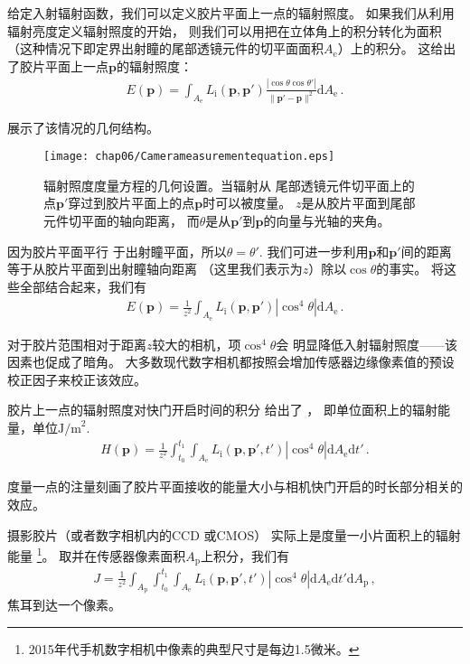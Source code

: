 给定入射辐射函数，我们可以定义胶片平面上一点的辐射照度。
如果我们从利用辐射亮度定义辐射照度的开始，
则我们可以用把在立体角上的积分转化为面积
（这种情况下即定界出射瞳的尾部透镜元件的切平面面积$A_{\mathrm{e}}$）上的积分。
这给出了胶片平面上一点$\bm p$的辐射照度：
\begin{align*}
    E({\bm p})=\int_{A_{\mathrm{e}}}{L_{\mathrm{i}}({\bm p},{\bm p}')
    \frac{|\cos\theta\cos\theta'|}{\|{\bm p}'-{\bm p}\|^2}\mathrm{d}A_{\mathrm{e}}}\, .
\end{align*}

展示了该情况的几何结构。
\begin{figure}[htbp]
    \centering\texttt{[image: chap06/Camerameasurementequation.eps]}
    \caption{辐射照度度量方程的几何设置。当辐射从
        尾部透镜元件切平面上的点$\bm p'$穿过到胶片平面上的点$\bm p$时可以被度量。
        $z$是从胶片平面到尾部元件切平面的轴向距离，
        而$\theta$是从$\bm p'$到$\bm p$的向量与光轴的夹角。}
    \label{fig:6.25}
\end{figure}

因为胶片平面平行
于出射瞳平面，所以$\theta=\theta'$.
我们可进一步利用$\bm p$和$\bm p'$间的距离等于从胶片平面到出射瞳轴向距离
（这里我们表示为$z$）除以$\cos\theta$的事实。
将这些全部结合起来，我们有
\begin{align}\label{eq:6.5}
    E({\bm p})=\frac{1}{z^2}\int_{A_{\mathrm{e}}}{L_{\mathrm{i}}({\bm p},{\bm p}')|\cos^4\theta|\mathrm{d}A_{\mathrm{e}}}\, .
\end{align}

对于胶片范围相对于距离$z$较大的相机，项$\cos^4\theta$会
明显降低入射辐射照度——该因素也促成了暗角。
大多数现代数字相机都按照会增加传感器边缘像素值的预设校正因子来校正该效应。

胶片上一点的辐射照度对快门开启时间的积分
给出了
，
即单位面积上的辐射能量，单位$\text{J/m}^2$.
\begin{align}\label{eq:6.6}
    H({\bm p})=\frac{1}{z^2}\int_{t_0}^{t_1}\int_{A_{\mathrm{e}}}
    L_{\mathrm{i}}({\bm p},{\bm p}',t')|\cos^4\theta|\mathrm{d}A_{\mathrm{e}}\mathrm{d}t'\, .
\end{align}

度量一点的注量刻画了胶片平面接收的能量大小与相机快门开启的时长部分相关的效应。

摄影胶片（或者数字相机内的CCD
或CMOS）
实际上是度量一小片面积上的辐射能量
\footnote{2015年代手机数字相机中像素的典型尺寸是每边1.5微米。}。
取并在传感器像素面积$A_{\mathrm{p}}$上积分，我们有
\begin{align}\label{eq:6.7}
    J=\frac{1}{z^2}\int_{A_{\mathrm{p}}}\int_{t_0}^{t_1}\int_{A_{\mathrm{e}}}
    L_{\mathrm{i}}({\bm p},{\bm p}',t')|\cos^4\theta|\mathrm{d}A_{\mathrm{e}}\mathrm{d}t'\mathrm{d}A_{\mathrm{p}}\, ,
\end{align}
焦耳到达一个像素。

